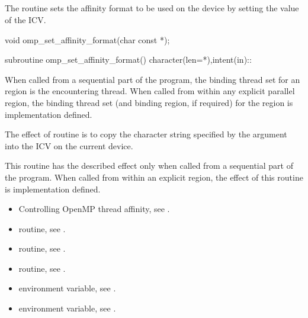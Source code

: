 \subsection{}
\label{subsec:omp_set_affinity_format}

\summary
The  routine sets the affinity format to be used on the device
by setting the value of the  ICV.

\format
\begin{ccppspecific}
\begin{ompcFunction}
void omp_set_affinity_format(char const *);
\end{ompcFunction}
\end{ccppspecific}

\begin{fortranspecific}
\begin{ompfSubroutine}
subroutine omp_set_affinity_format()
character(len=*),intent(in)::
\end{ompfSubroutine}
\end{fortranspecific}

\binding
When called from a sequential part of the program, the binding thread set for an
 region is the encountering thread. When called
from within any explicit parallel region, the binding thread set (and binding region, if
required) for the  region is implementation defined.

\effect
The effect of  routine is to copy the
character string specified by the  argument into the
 ICV on the current device.

This routine has the described effect only when called from a sequential part of the
program. When called from within an explicit  region, the effect of this
routine is implementation defined.

\crossreferences
\begin{itemize}
\item Controlling OpenMP thread affinity, see
.
\item {} routine, see .
\item {} routine, see .
\item {} routine, see .
\item {} environment variable, see
.
\item {} environment variable, see
.
\end{itemize}

